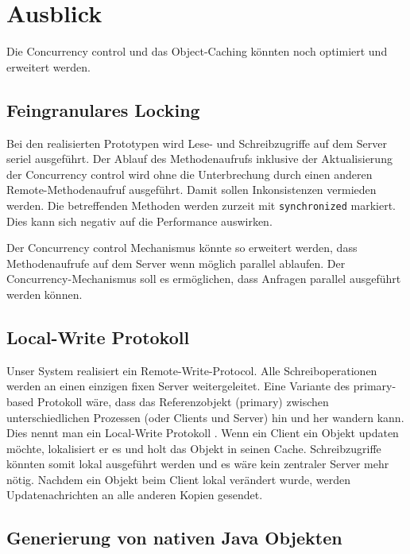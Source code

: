 \chapter{Ausblick}

Die Concurrency control und das Object-Caching könnten noch optimiert und erweitert werden.


\section{Feingranulares Locking}
\label{sec:feingr-lock}

Bei den realisierten Prototypen wird Lese- und Schreibzugriffe auf dem Server seriel ausgeführt. Der Ablauf des Methodenaufrufs inklusive der Aktualisierung der Concurrency control wird ohne die Unterbrechung durch einen anderen Remote-Methodenaufruf ausgeführt. Damit sollen Inkonsistenzen vermieden werden. Die betreffenden Methoden werden zur\-zeit mit \texttt{syn\-chro\-ni\-zed} markiert. Dies kann sich negativ auf die Performance auswirken. 

Der Concurrency control Mechanismus könnte so erweitert werden, dass Methodenaufrufe auf dem Server wenn möglich parallel ablaufen. 
Der Concurrency-Mechanismus soll es ermöglichen, dass Anfragen parallel ausgeführt werden können.

\section{Local-Write Protokoll}
\label{sec:local-write-prot}

Unser System realisiert ein Remote-Write-Protocol. Alle Schreiboperationen werden an einen einzigen fixen Server weitergeleitet.
Eine Variante des primary-based Protokoll wäre, dass das Referenzobjekt (primary) zwischen unterschiedlichen Prozessen (oder Clients und Server) hin und her wandern kann. Dies nennt man ein Local-Write Protokoll \cite{tanenbaum07}. Wenn ein Client ein Objekt updaten möchte, lokalisiert er es und holt das Objekt in seinen Cache. Schreibzugriffe könnten somit lokal ausgeführt werden und es wäre kein zentraler Server mehr nötig. Nachdem ein Objekt beim Client lokal verändert wurde, werden Updatenachrichten an alle anderen Kopien gesendet.

\section{Generierung von nativen Java Objekten}
\label{sec:gener-von-nativ}

